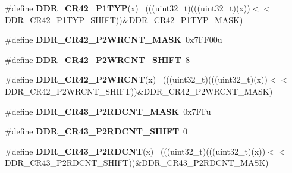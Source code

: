 \begin{DoxyCompactItemize}
\item 
\hypertarget{group___d_d_r___register___masks_gab6dccdcde6170cfa8c85724027dec2fc}{}\#define {\bfseries D\+D\+R\+\_\+\+C\+R42\+\_\+\+P1\+T\+Y\+P}(x)                                            ~(((uint32\+\_\+t)(((uint32\+\_\+t)(x))$<$$<$D\+D\+R\+\_\+\+C\+R42\+\_\+\+P1\+T\+Y\+P\+\_\+\+S\+H\+I\+F\+T))\&D\+D\+R\+\_\+\+C\+R42\+\_\+\+P1\+T\+Y\+P\+\_\+\+M\+A\+S\+K)\label{group___d_d_r___register___masks_gab6dccdcde6170cfa8c85724027dec2fc}

\item 
\hypertarget{group___d_d_r___register___masks_ga9d2e7c7266b46ebb4f7ca95ac65599c7}{}\#define {\bfseries D\+D\+R\+\_\+\+C\+R42\+\_\+\+P2\+W\+R\+C\+N\+T\+\_\+\+M\+A\+S\+K}~0x7\+F\+F00u\label{group___d_d_r___register___masks_ga9d2e7c7266b46ebb4f7ca95ac65599c7}

\item 
\hypertarget{group___d_d_r___register___masks_gaabebfe4014819e5df192cca6a555229b}{}\#define {\bfseries D\+D\+R\+\_\+\+C\+R42\+\_\+\+P2\+W\+R\+C\+N\+T\+\_\+\+S\+H\+I\+F\+T}~8\label{group___d_d_r___register___masks_gaabebfe4014819e5df192cca6a555229b}

\item 
\hypertarget{group___d_d_r___register___masks_gadb56a6af7a45de1449589926ab640418}{}\#define {\bfseries D\+D\+R\+\_\+\+C\+R42\+\_\+\+P2\+W\+R\+C\+N\+T}(x)                                        ~(((uint32\+\_\+t)(((uint32\+\_\+t)(x))$<$$<$D\+D\+R\+\_\+\+C\+R42\+\_\+\+P2\+W\+R\+C\+N\+T\+\_\+\+S\+H\+I\+F\+T))\&D\+D\+R\+\_\+\+C\+R42\+\_\+\+P2\+W\+R\+C\+N\+T\+\_\+\+M\+A\+S\+K)\label{group___d_d_r___register___masks_gadb56a6af7a45de1449589926ab640418}

\item 
\hypertarget{group___d_d_r___register___masks_ga0fc0e56a18091683abbde63f0bd3f8ff}{}\#define {\bfseries D\+D\+R\+\_\+\+C\+R43\+\_\+\+P2\+R\+D\+C\+N\+T\+\_\+\+M\+A\+S\+K}~0x7\+F\+Fu\label{group___d_d_r___register___masks_ga0fc0e56a18091683abbde63f0bd3f8ff}

\item 
\hypertarget{group___d_d_r___register___masks_ga752d73b28d6fdf737592f62c49572cce}{}\#define {\bfseries D\+D\+R\+\_\+\+C\+R43\+\_\+\+P2\+R\+D\+C\+N\+T\+\_\+\+S\+H\+I\+F\+T}~0\label{group___d_d_r___register___masks_ga752d73b28d6fdf737592f62c49572cce}

\item 
\hypertarget{group___d_d_r___register___masks_ga05cf403be1831d601302110e2fb9d625}{}\#define {\bfseries D\+D\+R\+\_\+\+C\+R43\+\_\+\+P2\+R\+D\+C\+N\+T}(x)                                        ~(((uint32\+\_\+t)(((uint32\+\_\+t)(x))$<$$<$D\+D\+R\+\_\+\+C\+R43\+\_\+\+P2\+R\+D\+C\+N\+T\+\_\+\+S\+H\+I\+F\+T))\&D\+D\+R\+\_\+\+C\+R43\+\_\+\+P2\+R\+D\+C\+N\+T\+\_\+\+M\+A\+S\+K)\label{group___d_d_r___register___masks_ga05cf403be1831d601302110e2fb9d625}


\end{DoxyCompactItemize}
